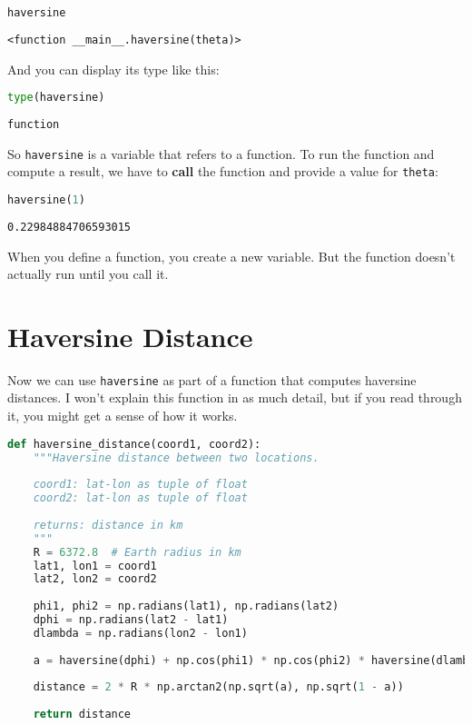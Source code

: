 \begin{lstlisting}[language=Python,style=source]
haversine
\end{lstlisting}

\begin{lstlisting}[style=output]
<function __main__.haversine(theta)>
\end{lstlisting}

And you can display its type like this:

\begin{lstlisting}[language=Python,style=source]
type(haversine)
\end{lstlisting}

\begin{lstlisting}[style=output]
function
\end{lstlisting}

So \passthrough{\lstinline!haversine!} is a variable that refers to a
function. To run the function and compute a result, we have to
\textbf{call} the function and provide a value for
\passthrough{\lstinline!theta!}:

\begin{lstlisting}[language=Python,style=source]
haversine(1)
\end{lstlisting}

\begin{lstlisting}[style=output]
0.22984884706593015
\end{lstlisting}

When you define a function, you create a new variable. But the function
doesn't actually run until you call it.

\hypertarget{haversine-distance}{%
\section{Haversine Distance}\label{haversine-distance}}

Now we can use \passthrough{\lstinline!haversine!} as part of a function
that computes haversine distances. I won't explain this function in as
much detail, but if you read through it, you might get a sense of how it
works.

\begin{lstlisting}[language=Python,style=source]
def haversine_distance(coord1, coord2):
    """Haversine distance between two locations.
    
    coord1: lat-lon as tuple of float 
    coord2: lat-lon as tuple of float
    
    returns: distance in km
    """
    R = 6372.8  # Earth radius in km
    lat1, lon1 = coord1
    lat2, lon2 = coord2
    
    phi1, phi2 = np.radians(lat1), np.radians(lat2) 
    dphi = np.radians(lat2 - lat1)
    dlambda = np.radians(lon2 - lon1)
    
    a = haversine(dphi) + np.cos(phi1) * np.cos(phi2) * haversine(dlambda)
    
    distance = 2 * R * np.arctan2(np.sqrt(a), np.sqrt(1 - a))
    
    return distance
\end{lstlisting}

